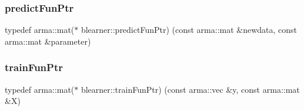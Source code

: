 \mbox{\label{namespaceblearner_a93d5b51440d434704d2bde9dee652f6e}} 
\subsubsection{\texorpdfstring{predict\+Fun\+Ptr}{predictFunPtr}}
{\footnotesize\ttfamily typedef arma\+::mat($\ast$ blearner\+::predict\+Fun\+Ptr) (const arma\+::mat \&newdata, const arma\+::mat \&parameter)}

\mbox{\label{namespaceblearner_a5e2b38edf05e32681bee136af9ae505d}} 
\subsubsection{\texorpdfstring{train\+Fun\+Ptr}{trainFunPtr}}
{\footnotesize\ttfamily typedef arma\+::mat($\ast$ blearner\+::train\+Fun\+Ptr) (const arma\+::vec \&y, const arma\+::mat \&X)}


